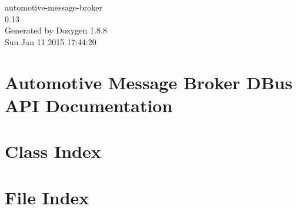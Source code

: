 \documentclass[twoside]{book}
\newcommand{\+}{\discretionary{\mbox{\scriptsize$\hookleftarrow$}}{}{}}
\newcommand{\clearemptydoublepage}{%
  \newpage{\pagestyle{empty}\cleardoublepage}%
}
\begin{document}
\hypersetup{pageanchor=false,
             bookmarks=true,
             bookmarksnumbered=true,
             pdfencoding=unicode
            }
\begin{titlepage}
\vspace*{7cm}
\begin{center}%
{\Large automotive-\/message-\/broker \\[1ex]\large 0.\+13 }\\
\vspace*{1cm}
{\large Generated by Doxygen 1.8.8}\\
\vspace*{0.5cm}
{\small Sun Jan 11 2015 17:44:20}\\
\end{center}
\end{titlepage}
\clearemptydoublepage
\tableofcontents
\clearemptydoublepage
{}
\hypersetup{pageanchor=true}

\chapter{Automotive Message Broker D\+Bus A\+P\+I Documentation}
\label{index}\hypertarget{index}{}
\chapter{Class Index}

\chapter{File Index}

\end{document}

